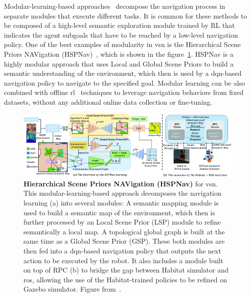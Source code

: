 Modular-learning-based approaches~\cite{chaplot2020, chang2020, skillfusion, Li2023RDDRLAR, zhou2022improving, Cai2024DGMemLV, Wang2023ProbableOL, Wasserman2023ExploitationGuidedEF, Yokoyama2023VLFMVF} decompose the navigation process in separate modules that execute different tasks.
It is common for these methods to be composed of a high-level semantic exploration module trained by \acrshort{RL} that indicates the agent subgoals that have to be reached by a low-level navigation policy.
One of the best examples of modularity in \acrshort{vsn} is the Hierarchical Scene Priors NAVigation (HSPNav)~\cite{Kang2024HSPNavHS}, which is shown in the figure~\ref{fig:modular-learning}.
HSPNav is a highly modular approach that uses Local and Global Scene Priors to build a semantic understanding of the environment, which then is used by a \acrshort{dqn}-based~\cite{mnih2013} navigation policy to navigate to the specified goal.
Modular learning can be also combined with offline \acrshort{rl}~\cite{shah2022} techniques to leverage navigation behaviors from fixed datasets, without any additional online data collection or fine-tuning.

\begin{figure}
    \centering
    \includegraphics[width=\textwidth]{figures/related_work/modular_learning}
    \caption[Hierarchical Scene Priors NAVigation (HSPNav) for \acrlong{vsn}]{\textbf{Hierarchical Scene Priors NAVigation (HSPNav)} for \acrlong{vsn}.
    This modular-learning-based approach decomposes the navigation learning (a) into several modules:
    A semantic mapping module is used to build a semantic map of the environment, which then is further processed by an Local Scene Prior (LSP) module to refine semantically a local map.
    A topological global graph is built at the same time as a Global Scene Prior (GSP).
    These both modules are then fed into a \acrshort{dqn}-based navigation policy that outputs the next action to be executed by the robot.
    It also includes a module built on top of RPC (b) to bridge the gap between Habitat simulator and \acrshort{ros}, allowing the use of the Habitat-trained policies to be refined on Gazebo simulator.
    Figure from~\cite{Kang2024HSPNavHS}.}
    \label{fig:modular-learning}
\end{figure}

